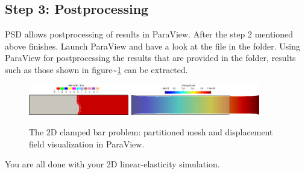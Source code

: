 \subsection{Step 3: Postprocessing}

PSD allows postprocessing of results in ParaView. After the step 2
mentioned above finishes. Launch ParaView and have a look at the
 file in the  folder. Using ParaView for
postprocessing the results that are provided in the 
folder, results such as those shown in
figure\textasciitilde{}\ref{bar-le-full-clamped} can be extracted.

\begin{figure}[h!]
\centering
\includegraphics[width=0.39\textwidth]{./Images/le-2d-bar-clamped-pulled-partioned}\hfill
\includegraphics[width=0.5\textwidth]{./Images/le-2d-bar-clamped-pulled.png}
\caption{The 2D clamped bar problem: partitioned mesh and displacement field visualization in ParaView. \label{bar-le-full-clamped}}
\end{figure}

You are all done with your 2D linear-elasticity simulation.
